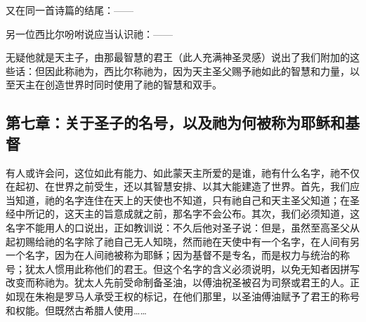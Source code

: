 \par

又在同一首诗篇的结尾：——\par

\par

另一位西比尔吩咐说应当认识祂：——\par

\par

无疑他就是天主子，由那最智慧的君王（此人充满神圣灵感）说出了我们附加的这些话：但因此称祂为，西比尔称祂为，因为天主圣父赐予祂如此的智慧和力量，以至天主在创造世界时同时使用了祂的智慧和双手。\par


\subsection{第七章：关于圣子的名号，以及祂为何被称为耶稣和基督}

有人或许会问，这位如此有能力、如此蒙天主所爱的是谁，祂有什么名字，祂不仅在起初、在世界之前受生，还以其智慧安排、以其大能建造了世界。首先，我们应当知道，祂的名字连住在天上的天使也不知道，只有祂自己和天主圣父知道；在圣经中所记的，这天主的旨意成就之前，那名字不会公布。其次，我们必须知道，这名字不能用人的口说出，正如教训说：不久后他对圣子说：但是，虽然至高圣父从起初赐给祂的名字除了祂自己无人知晓，然而祂在天使中有一个名字，在人间有另一个名字，因为在人间祂被称为耶稣；因为基督不是专名，而是权力与统治的称号；犹太人惯用此称他们的君王。但这个名字的含义必须说明，以免无知者因拼写改变而称祂为。犹太人先前受命制备圣油，以傅油祝圣被召为司祭或君王的人。正如现在朱袍是罗马人承受王权的标记，在他们那里，以圣油傅油赋予了君王的称号和权能。但既然古希腊人使用……\par


